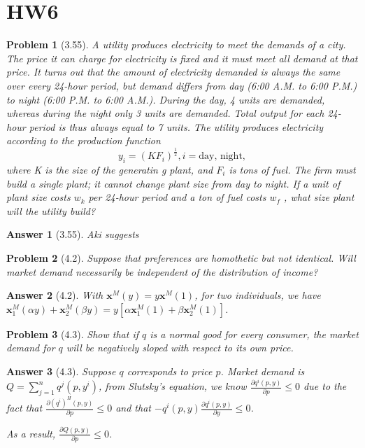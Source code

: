 \documentclass{article}
\newtheorem*{ans}{Answer}
\newtheorem*{prob}{{\bf Problem}}
\newcommand{\1}{{\bf 1}}
\newcommand{\0}{{\mathbf{0}}}
\newcommand{\x}{{\mathbf{x}}}
\newcommand{\<}{\langle}
\renewcommand{\>}{\rangle}
\begin{document}
\section{HW6}
\begin{prob}[3.55]
	A utility produces electricity to meet the demands of a city. The price it can charge for electricity is fixed and it must meet all demand at that price. It turns out that the amount of electricity demanded is always the same over every 24-hour period, but demand differs from day (6:00 A.M. to 6:00 P.M.) to night (6:00 P.M. to 6:00 A.M.). During the day, 4 units are demanded, whereas during the night only 3 units are demanded. Total output for each 24-hour period is thus always equal to 7 units. The utility produces electricity according to the production function
$$y_i = (KF_i)^{\frac12 }, i = \text{day, night},$$
where K is the size of the generatin g plant, and $F_i$ is tons of fuel. The firm must build a single plant; it cannot change plant size from day to night. If a unit of plant size costs $w_k$ per 24-hour period and a ton of fuel costs $w_f$ , what size plant will the utility build?
\end{prob}

\begin{ans}[3.55]
	Aki suggests 
\end{ans}

\begin{prob}[4.2] Suppose that preferences are homothetic but not identical. Will market demand necessarily be independent of the distribution of income?
\end{prob}
\begin{ans}[4.2] With $\x^M (y) =y \x^M (1)$, for two individuals, we have $\x_1^M (\alpha y) + \x_2^M (\beta y) = y \left[\alpha \x_1^M (1)  + \beta \x_2^M (1) \right]$.
\end{ans}
\begin{prob}[4.3] Show that if $q$ is a normal good for every consumer, the market demand for $q$ will be negatively sloped with respect to its own price.
\end{prob}
\begin{ans}[4.3] Suppose $q$ corresponds to price $p$. Market demand is $Q = \sum_{j=1}^n q^j(p, y^i)$, from Slutsky's equation, we know 
$
	\frac{\partial q^i(p, y)}{\partial p} \le 0$ due to the fact that $	\frac{\partial \left( q^i \right)^H (p, y)}{\partial p} \le 0$ and that $ -q^i(p,y)	\frac{\partial q^i(p, y)}{\partial y} \le 0$.
	
	As a result, $	\frac{\partial Q (p, y)}{\partial p } \le 0$.
	
\end{ans}
\end{document}
